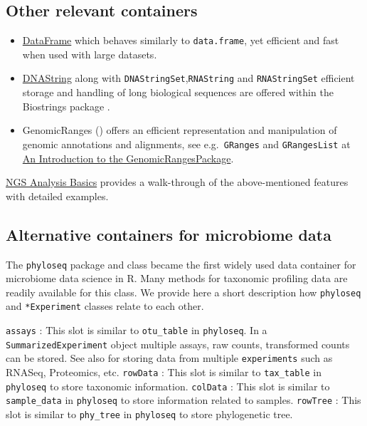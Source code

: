 \documentclass[
]{book}
\providecommand{\tightlist}{%
  \setlength{\itemsep}{0pt}\setlength{\parskip}{0pt}}
\begin{document}
\hypertarget{other-relevant-containers}{%
\subsection{Other relevant containers}\label{other-relevant-containers}}

\begin{itemize}
\tightlist
\item
  \href{https://rdrr.io/bioc/S4Vectors/man/DataFrame-class.html}{DataFrame} which behaves similarly to \texttt{data.frame}, yet efficient and fast when used with large datasets.
\item
  \href{https://rdrr.io/bioc/Biostrings/man/DNAString-class.html}{DNAString} along with \texttt{DNAStringSet},\texttt{RNAString} and \texttt{RNAStringSet} efficient storage and handling of long biological sequences are offered within the Biostrings package \citep{R-Biostrings}.
\item
  GenomicRanges (\citep{GenomicRanges2013}) offers an efficient representation and manipulation of genomic annotations and alignments, see e.g.~\texttt{GRanges} and \texttt{GRangesList} at \href{https://bioconductor.org/packages/release/bioc/vignettes/GenomicRanges/inst/doc/GenomicRangesIntroduction.html}{An Introduction to the GenomicRangesPackage}.
\end{itemize}

\href{http://girke.bioinformatics.ucr.edu/GEN242/tutorials/rsequences/rsequences/}{NGS Analysis Basics} provides a walk-through of the above-mentioned features with detailed examples.

\hypertarget{alternative-containers-for-microbiome-data}{%
\subsection{Alternative containers for microbiome data}\label{alternative-containers-for-microbiome-data}}

The \texttt{phyloseq} package and class became the first widely used data
container for microbiome data science in R. Many methods for taxonomic
profiling data are readily available for this class. We provide here a
short description how \texttt{phyloseq} and \texttt{*Experiment} classes relate to
each other.

\texttt{assays} : This slot is similar to \texttt{otu\_table} in \texttt{phyloseq}. In a
\texttt{SummarizedExperiment} object multiple assays, raw
counts, transformed counts can be stored. See also
\citep{Ramos2017}
for storing data from multiple \texttt{experiments} such as
RNASeq, Proteomics, etc. \texttt{rowData} : This slot is
similar to \texttt{tax\_table} in \texttt{phyloseq} to store taxonomic
information. \texttt{colData} : This slot is similar to
\texttt{sample\_data} in \texttt{phyloseq} to store information
related to samples. \texttt{rowTree} : This slot is similar
to \texttt{phy\_tree} in \texttt{phyloseq} to store phylogenetic tree.
\end{document}
